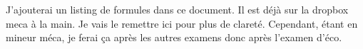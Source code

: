 


J'ajouterai un listing de formules dans ce document. Il est déjà sur la dropbox meca à la main. Je vais le remettre ici pour plus de clareté.
Cependant, étant en mineur méca, je ferai ça après les autres examens donc après l'examen d'éco.


